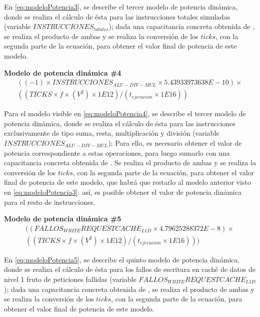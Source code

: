 En \ref{eq:modeloPotencia3}, se describe el tercer modelo de potencia dinámica, donde se realiza el cálculo de ésta para las instrucciones totales simuladas (variable $INSTRUCCIONES_{totales}$); dada una capacitancia concreta obtenida de \cite{soton393728} \cite{soton418538}, se realiza el producto de ambas y se realiza la conversión de los $ticks$, con la segunda parte de la ecuación, para obtener el valor final de potencia de este modelo.

\par{\textbf{Modelo de potencia dinámica \#4}}{
\begin{equation}
\begin{split}
((-1) \times INSTRUCCIONES_{ALU-DIV-MUL} \times 5.43933973638E-10) \times \\ ((TICKS \times f \times (V^2) \times 1E12) / (t_{ejecucion} \times 1E16))
\end{split}
\label{eq:modeloPotencia4}
\end{equation}
}

Para el modelo visible en \ref{eq:modeloPotencia4}, se describe el tercer modelo de potencia dinámica, donde se realiza el cálculo de ésta para las instrucciones exclusivamente de tipo suma, resta, multiplicación y división (variable $INSTRUCCIONES_{ALU-DIV-MUL}$); Para ello, es necesario obtener el valor de potencia correspondiente a estas operaciones, para luego sumarlo con una capacitancia concreta obtenida de \cite{soton393728} \cite{soton418538}. Se realiza el producto de ambas y se realiza la conversión de los $ticks$, con la segunda parte de la ecuación, para obtener el valor final de potencia de este modelo, que habrá que restarlo al modelo anterior visto en \ref{eq:modeloPotencia3}: así, es posible obtener el valor de potencia dinámica para el resto de instrucciones.


\par{\textbf{Modelo de potencia dinámica \#5}}{
\begin{equation}
\begin{split}
((FALLOS_{WRITE}REQUESTCACHE_{L1D} \times 4.79625288372E-8) \times \\ ((TICKS \times f \times (V^2) \times 1E12) / (t_{ejecucion} \times 1E16)))
\end{split}
\label{eq:modeloPotencia5}
\end{equation}
}

En \ref{eq:modeloPotencia5}, se describe el quinto modelo de potencia dinámica, donde se realiza el cálculo de ésta para los fallos de escritura en caché de datos de nivel 1 fruto de peticiones fallidas (variable $FALLOS_{WRITE}REQUESTCACHE_{L1D}$); dada una capacitancia concreta obtenida de \cite{soton393728} \cite{soton418538}, se realiza el producto de ambas y se realiza la conversión de los $ticks$, con la segunda parte de la ecuación, para obtener el valor final de potencia de este modelo.

